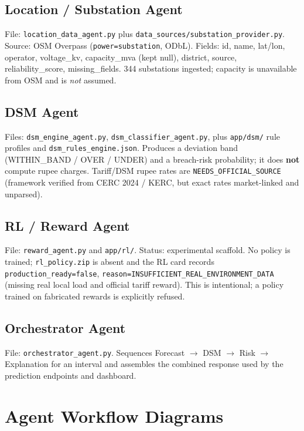 \documentclass[11pt,a4paper]{article}
\newcommand{\code}[1]{\texttt{\small #1}}
\begin{document}
\subsection{Location / Substation Agent}
File: \code{location\_data\_agent.py} plus
\code{data\_sources/substation\_provider.py}. Source: OSM Overpass (\code{power=substation},
ODbL). Fields: id, name, lat/lon, operator, voltage\_kv, capacity\_mva (kept null),
district, source, reliability\_score, missing\_fields. 344 substations ingested; capacity
is unavailable from OSM and is \emph{not} assumed.

\subsection{DSM Agent}
Files: \code{dsm\_engine\_agent.py}, \code{dsm\_classifier\_agent.py}, plus
\code{app/dsm/} rule profiles and \code{dsm\_rules\_engine.json}. Produces a deviation
band (WITHIN\_BAND / OVER / UNDER) and a breach-risk probability; it does \textbf{not}
compute rupee charges. Tariff/DSM rupee rates are \code{NEEDS\_OFFICIAL\_SOURCE}
(framework verified from CERC 2024 / KERC, but exact rates market-linked and unparsed).

\subsection{RL / Reward Agent}
File: \code{reward\_agent.py} and \code{app/rl/}. Status: experimental scaffold. No policy
is trained; \code{rl\_policy.zip} is absent and the RL card records
\code{production\_ready=false}, \code{reason=INSUFFICIENT\_REAL\_ENVIRONMENT\_DATA}
(missing real local load and official tariff reward). This is intentional; a policy trained
on fabricated rewards is explicitly refused.

\subsection{Orchestrator Agent}
File: \code{orchestrator\_agent.py}. Sequences Forecast $\rightarrow$ DSM $\rightarrow$
Risk $\rightarrow$ Explanation for an interval and assembles the combined response used by
the prediction endpoints and dashboard.

\section{Agent Workflow Diagrams}
\end{document}
